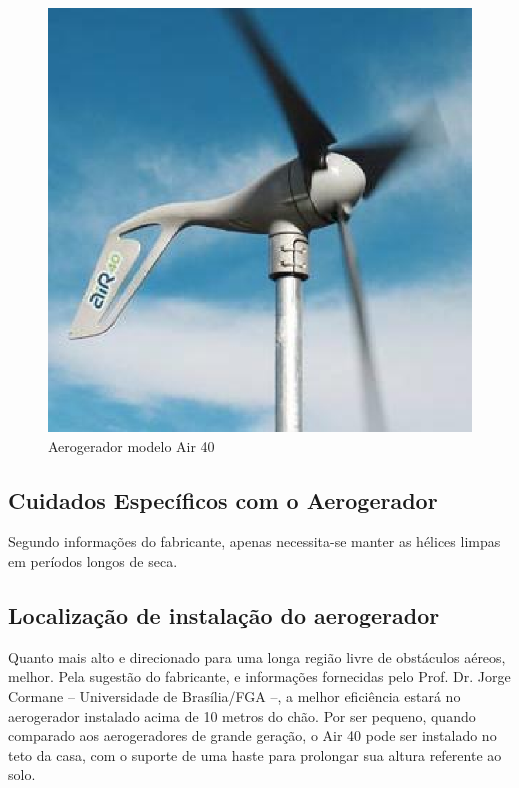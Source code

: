 \begin{figure}[H]
  \begin{center}
	\includegraphics[keepaspectratio,scale=0.5]{figuras/air_40.eps}
	\caption{Aerogerador modelo Air 40}
  \end{center}
\end{figure}


\subsection{Cuidados Específicos com o Aerogerador}

	Segundo informações do fabricante, apenas necessita-se manter as hélices limpas em períodos longos de seca.

\subsection{Localização de instalação do aerogerador}

	Quanto mais alto e direcionado para uma longa região livre de obstáculos aéreos, melhor. Pela sugestão do fabricante, e informações fornecidas pelo Prof. Dr. Jorge Cormane -- Universidade de Brasília/FGA --, a melhor eficiência estará no aerogerador instalado acima de 10 metros do chão. Por ser pequeno, quando comparado aos aerogeradores de grande geração, o Air 40 pode ser instalado no teto da casa, com o suporte de uma haste para prolongar sua altura referente ao solo.

